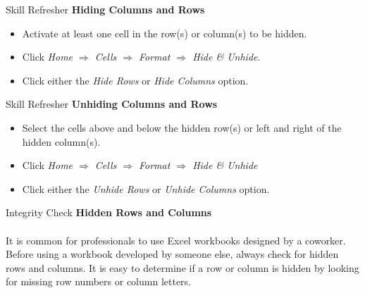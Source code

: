 \begin{center}
	\begin{sklbox}{Skill Refresher}
		\textbf{Hiding Columns and Rows}
		\\
		\begin{itemize}
			\setlength{\itemsep}{0pt}
			\setlength{\parskip}{0pt}
			\setlength{\parsep}{0pt}
			
			\item Activate at least one cell in the row(s) or column(s) to be hidden.
			\item Click \textit{Home $ \Rightarrow $ Cells $ \Rightarrow $ Format $ \Rightarrow $ Hide \& Unhide}.
			\item Click either the \textit{Hide Rows} or \textit{Hide Columns} option.
			
		\end{itemize}
	\end{sklbox}
\end{center}


\begin{center}
	\begin{sklbox}{Skill Refresher}
		\textbf{Unhiding Columns and Rows}
		\\
		\begin{itemize}
			\setlength{\itemsep}{0pt}
			\setlength{\parskip}{0pt}
			\setlength{\parsep}{0pt}
			
			\item Select the cells above and below the hidden row(s) or left and right of the hidden column(s).
			\item Click \textit{Home $ \Rightarrow $ Cells $ \Rightarrow $ Format $ \Rightarrow $ Hide \& Unhide}
			\item Click either the \textit{Unhide Rows} or \textit{Unhide Columns} option.
			
		\end{itemize}
	\end{sklbox}
\end{center}

\begin{center}
	\begin{infobox}{Integrity Check}
		\textbf{Hidden Rows and Columns}
		\\
		\\
		It is common for professionals to use Excel workbooks designed by a coworker. Before using a workbook developed by someone else, always check for hidden rows and columns. It is easy to determine if a row or column is hidden by looking for missing row numbers or column letters.
	\end{infobox}
\end{center}

